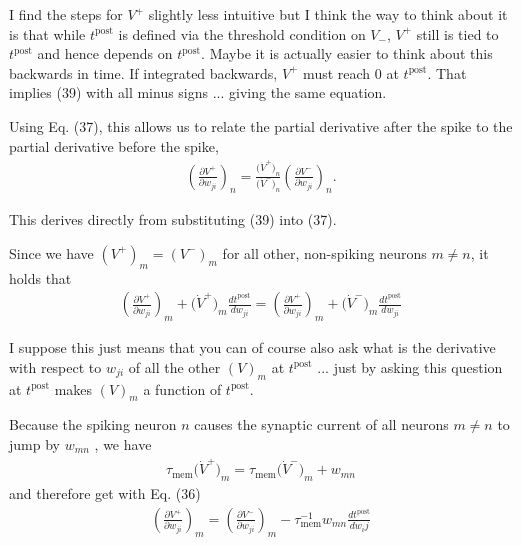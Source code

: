 \documentclass[a4paper]{article}
\newcommand{\blue}[1]{{\color{blue}#1}}
\begin{document}
I find the steps for $V^+$ slightly less intuitive but I think the
way to think about it is that while $t^{\text{post}}$ is defined
via the threshold condition on $V_-$, $V^+$ still is tied to
$t^{\text{post}}$ and hence depends on $t^{\text{post}}$. Maybe it
is actually easier to think about this backwards in time. If
integrated backwards, $V^+$ must reach $0$ at
$t^{\text{post}}$. That implies \blue{(39)} with all minus signs
... giving the same equation.

\blue{Using Eq. (37), this allows us to relate the partial derivative after the spike to the partial derivative before
  the spike,
  \begin{align}
    \left(\frac{\partial V^+}{\partial w_{ji}}\right)_n =
    \frac{\big(\dot{V}^+\big)_n}{\big(\dot{V}^-\big)_n}
    \left(\frac{\partial V^-}{\partial w_{ji}}\right)_n . \tag{40}
  \end{align}
}

This derives directly from substituting \blue{(39)} into \blue{(37)}.

\blue{
  Since we have $(V^+)_m = (V^-)_m$ for all other, non-spiking
  neurons $m \neq n$, it holds that
  \begin{align}
    \left(\frac{\partial V^+}{\partial w_{ji}}\right)_m + \big(
    \dot{V}^+\big)_m \frac{d t^{\text{post}}}{d w_{ji}} =
    \left(\frac{\partial V^+}{\partial w_{ji}}\right)_m + \big(
    \dot{V}^-\big)_m \frac{d t^{\text{post}}}{d w_{ji}} \tag{41}
  \end{align}
}

I suppose this just means that you can of course also ask what is the
derivative with respect to $w_{ji}$ of all the other $(V)_m$ at
$t^{\text{post}}$ ... just by asking this question at
$t^{\text{post}}$ makes $(V)_m$ a function of $t^{\text{post}}$.
    
\blue{
  Because the spiking neuron $n$ causes the synaptic current of all neurons $m \neq n$ to jump by $w_{mn}$ , we have
  \begin{align}
    \tau_{\text{mem}} \big(\dot{V}^+\big)_m = \tau_{\text{mem}}
    \big(\dot{V}^-\big)_m +w_{mn} \tag{42}
  \end{align}
  and therefore get with Eq. (36)
  \begin{align}
    \left(\frac{\partial V^+}{\partial w_{ji}}\right)_m =
    \left(\frac{\partial V^-}{\partial w_{ji}}\right)_m -
    \tau_{\text{mem}}^{-1} w_{mn} \frac{d t^{\text{post}}}{dw_ij}
    \tag{43} 
  \end{align}
  }
\end{document}
